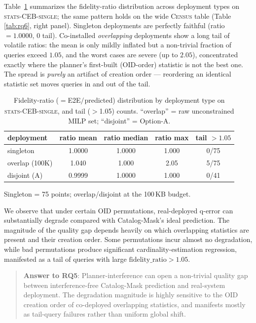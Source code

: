 \documentclass[sigconf, nonacm]{acmart}
\begin{document}
Table~\ref{tab:rq5} summarizes the fidelity-ratio distribution across
deployment types on \textsc{stats-CEB-single}; the same pattern holds on the
wide \textsc{Census} table (Table \ref{tab:rq6}, right panel). Singleton
deployments are perfectly faithful (ratio $=1.0000$, $0$ tail). Co-installed
\emph{overlapping} deployments show a long tail of volatile ratios: the mean is
only mildly inflated but a non-trivial fraction of queries exceed $1.05$, and
the worst cases are severe (up to $2.05$), concentrated exactly where the
planner's first-built (OID-order) statistic is not the best one. The spread is
\emph{purely} an artifact of creation order --- reordering an identical
statistic set moves queries in and out of the tail.

\begin{table}[t]
\caption{Fidelity-ratio ($=$E2E$/_{}$predicted) distribution by deployment type
on \textsc{stats-CEB-single}, and tail ($>$1.05) counts. ``overlap''
= raw unconstrained MILP set; ``disjoint'' = Option-A.}
\label{tab:rq5}
\small
\begin{tabular}{lcccc}
\toprule
deployment & ratio mean & ratio median & ratio max & tail ${>}1.05$\\
\midrule
singleton      & 1.0000 & 1.0000 & 1.000 & 0/75\\
overlap (100K) & 1.040  & 1.000  & 2.05  & 5/75\\
disjoint (A)   & 0.9999 & 1.0000 & 1.000 & 0/41\\
\bottomrule
\end{tabular}

{\footnotesize Singleton = 75 points; overlap/disjoint at the 100\,KB budget.}
\end{table}

We observe that under certain OID permutations, real-deployed q-error can substantially degrade compared with Catalog-Mask's ideal prediction.
The magnitude of the quality gap depends heavily on which overlapping statistics are present and their creation order.
Some permutations incur almost no degradation, while bad permutations produce significant cardinality-estimation regression, manifested as a tail of queries with large $\text{fidelity\_ratio}>1.05$.

\begin{quote}
\noindent\textbf{Answer to RQ5}:
Planner-interference can open a non-trivial quality gap between interference-free Catalog-Mask prediction and real-system deployment.
The degradation magnitude is highly sensitive to the OID creation order of co-deployed overlapping statistics, and manifests mostly as tail-query failures rather than uniform global shift.
\end{quote}
\end{document}
